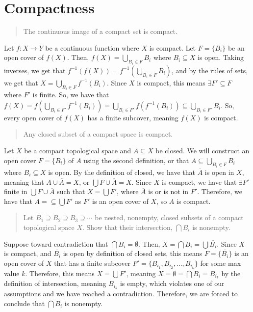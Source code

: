 \documentclass[12pt]{extarticle}
\begin{document}
\section*{Compactness}%
  \begin{quote}
    The continuous image of a compact set is compact.
  \end{quote}
  Let $f:X\rightarrow Y$ be a continuous function where $X$ is compact. Let $F = \{B_i\}$ be an open cover of $f(X)$. Then, $f(X) = \bigcup_{B_i\in F} B_i$ where $B_i\subseteq X$ is open. Taking inverses, we get that $f^{-1}(f(X)) = f^{-1}\left(\bigcup_{B_i\in F}B_i\right)$, and by the rules of sets, we get that $X = \bigcup_{B_i\in F}f^{-1}(B_i)$. Since $X$ is compact, this means $\exists F'\subseteq F$ where $F'$ is finite. So, we have that $f(X) = f\left(\bigcup_{B_i\in F'}f^{-1}(B_i)\right) = \bigcup_{B_i\in F'}f(f^{-1}(B_i))\subseteq \bigcup_{B_i\in F'}B_i$. So, every open cover of $f(X)$ has a finite subcover, meaning $f(X)$ is compact.
  \begin{quote}
    Any closed subset of a compact space is compact.
  \end{quote}
  Let $X$ be a compact topological space and $A\subseteq X$ be closed. We will construct an open cover $F = \{B_i\}$ of $A$ using the second definition, or that $A\subseteq \bigcup_{B_i\in F}B_i$ where $B_i\subseteq X$ is open. By the definition of closed, we have that $\overline{A}$ is open in $X$, meaning that $A\cup\overline{A} = X$, or $\bigcup F \cup \overline{A} = X$. Since $X$ is compact, we have that $\exists F'$ finite in $\bigcup F \cup \overline{A}$ such that $X = \bigcup F'$, where $\overline{A}$ is or is not in $F'$. Therefore, we have that $A = \subseteq \bigcup F'$ as $F'$ is an open cover of $X$, so $A$ is compact.
  \begin{quote}
    Let $B_1\supseteq B_2\supseteq B_3\supseteq \cdots$ be nested, nonempty, closed subsets of a compact topological space $X$. Show that their intersection, $\bigcap B_i$ is nonempty.
  \end{quote}
  Suppose toward contradiction that $\bigcap B_i = \emptyset$. Then, $X = \overline{\bigcap B_i} = \bigcup\overline{B_i}$. Since $X$ is compact, and $\overline{B_i}$ is open by definition of closed sets, this means $F = \{\overline{B_i}\}$ is an open cover of $X$ that has a finite subcover $F' = \{B_{i_1},B_{i_2},\dots,B_{i_k}\}$ for some max value $k$. Therefore, this means $X = \bigcup F'$, meaning $\overline{X} = \emptyset = \bigcap B_i = B_{i_{k}}$ by the definition of intersection, meaning $B_{i_{k}}$ is empty, which violates one of our assumptions and we have reached a contradiction. Therefore, we are forced to conclude that $\bigcap B_i$ is nonempty.
\end{document}
